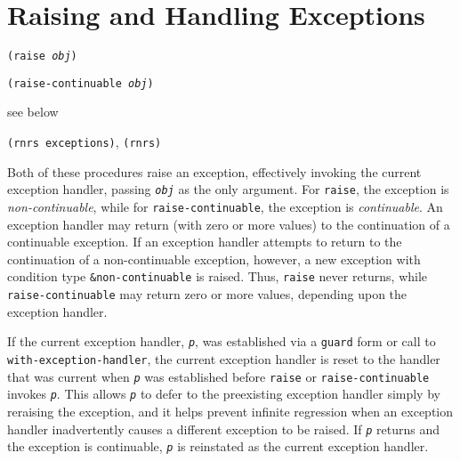\section{\label{exceptions_g148}\label{exceptions_h1}Raising and Handling Exceptions}


\begin{description}

\label{exceptions_s3}\item[procedure] \texttt{(raise \textit{obj})}



\item[procedure] \texttt{(raise-continuable \textit{obj})}



\item[returns] see below


\item[libraries] \texttt{(rnrs exceptions)}, \texttt{(rnrs)}
\end{description}


Both of these procedures raise an exception, effectively invoking the
current exception handler, passing \texttt{\textit{obj}} as the only argument.
For \texttt{raise}, the exception is \textit{non-continuable}, while
for \texttt{raise-continuable}, the exception is \textit{continuable}.
An exception handler may return (with zero or more values) to the
continuation of a continuable exception.
If an exception handler attempts to return to the continuation of a
non-continuable exception, however, a new exception with condition type
\texttt{\&{}non-continuable} is raised.
Thus, \texttt{raise} never returns, while \texttt{raise-continuable}
may return zero or more values, depending upon the exception handler.


If the current exception handler, \texttt{\textit{p}}, was established via a
\texttt{guard} form or call to \texttt{with-exception-handler}, the
current exception handler is reset to the handler that was current when
\texttt{\textit{p}} was established before \texttt{raise} or
\texttt{raise-continuable} invokes \texttt{\textit{p}}.
This allows \texttt{\textit{p}} to defer to the preexisting exception handler simply
by reraising the exception, and it helps prevent infinite regression when
an exception handler inadvertently causes a different exception to be raised.
If \texttt{\textit{p}} returns and the exception is continuable, \texttt{\textit{p}} is
reinstated as the current exception handler.



